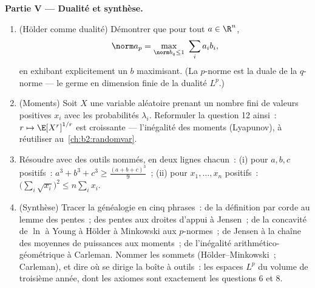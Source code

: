 \begin{problem}
\medskip
\noindent\textbf{Partie V --- Dualité et synthèse.}
\begin{enumerate}[resume]
  \item (Hölder comme dualité) Démontrer que pour tout $a \in
        \R^n$,
        \[
        \norm a_p = \max_{\norm b_q \leq 1}\ \sum_i a_ib_i ,
        \]
        en exhibant explicitement un $b$ maximisant. (La $p$-norme
        est la duale de la $q$-norme --- le germe en dimension finie
        de la dualité $L^p$.)
  \item (Moments) Soit $X$ une variable aléatoire prenant un nombre
        fini de valeurs positives $x_i$ avec les probabilités
        $\lambda_i$. Reformuler la question 12 ainsi~: $r \mapsto
        \E[X^r]^{1/r}$ est croissante --- l'inégalité des moments
        (Lyapunov), à réutiliser au~\cref{ch:b2:randomvar}.
  \item Résoudre avec des outils nommés, en deux lignes chacun~: (i)
        pour $a, b, c$ positifs~: $a^3 + b^3 + c^3 \geq
        \frac{(a+b+c)^3}{9}$~; (ii) pour $x_1, \dots,
        x_n$ positifs~: $\bigl(\sum_i\sqrt{x_i}\bigr)^2 \leq
        n\sum_i x_i$.
  \item (Synthèse) Tracer la généalogie en cinq phrases~: de la
        définition par corde au lemme des pentes~; des pentes aux
        droites d'appui à Jensen~; de la concavité de $\ln$ à Young
        à Hölder à Minkowski aux $p$-normes~; de Jensen à la chaîne
        des moyennes de puissances aux moments~; de l'inégalité
        arithmético-géométrique à Carleman. Nommer les sommets
        (Hölder--Minkowski~; Carleman), et dire où se dirige la
        boîte à outils~: les espaces $L^p$ du volume de troisième
        année, dont les axiomes sont exactement les questions 6 et 8.
\end{enumerate}
\end{problem}
